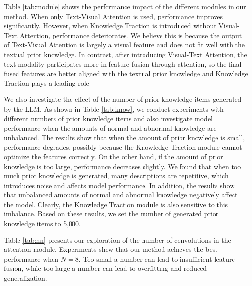 Table \ref{tab:module} shows the performance impact of the different modules in our method. When only Text-Visual Attention is used, performance improves significantly. However, when Knowledge Traction is introduced without Visual-Text Attention, performance deteriorates. We believe this is because the output of Text-Visual Attention is largely a visual feature and does not fit well with the textual prior knowledge. In contrast, after introducing Visual-Text Attention, the text modality participates more in feature fusion through attention, so the final fused features are better aligned with the textual prior knowledge and Knowledge Traction plays a leading role.

We also investigate the effect of the number of prior knowledge items generated by the LLM. As shown in Table \ref{tab:know}, we conduct experiments with different numbers of prior knowledge items and also investigate model performance when the amounts of normal and abnormal knowledge are unbalanced. The results show that when the amount of prior knowledge is small, performance degrades, possibly because the Knowledge Traction module cannot optimize the features correctly. On the other hand, if the amount of prior knowledge is too large, performance decreases slightly. We found that when too much prior knowledge is generated, many descriptions are repetitive, which introduces noise and affects model performance. In addition, the results show that unbalanced amounts of normal and abnormal knowledge negatively affect the model. Clearly, the Knowledge Traction module is also sensitive to this imbalance. Based on these results, we set the number of generated prior knowledge items to 5,000.

Table \ref{tab:nn} presents our exploration of the number of convolutions in the attention module. Experiments show that our method achieves the best performance when $N = 8$. Too small a number can lead to insufficient feature fusion, while too large a number can lead to overfitting and reduced generalization.


